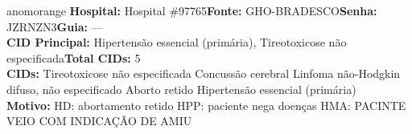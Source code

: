 \documentclass[a4paper,10pt]{article}
\begin{document}
\begin{anomalycard}[Interna\c{c}\~{a}o \#118809 | Pac. \#98548 | ALTO (z=4.33) | LOS: 1d | 26/02/2026\,$\to$\,27/02/2026]{anomorange}
\textbf{Hospital:} Hospital \#97765\quad \textbf{Fonte:} GHO-BRADESCO\quad \textbf{Senha:} JZRNZN3\quad \textbf{Guia:} ---\\

\textbf{CID Principal:} {\small Hipertensão essencial (primária), Tireotoxicose não especificada}\quad\textbf{Total CIDs:} 5\\

\textbf{CIDs:} {\scriptsize Tireotoxicose não especificada \textbar{} Concussão cerebral \textbar{} Linfoma não-Hodgkin difuso, não especificado \textbar{} Aborto retido \textbar{} Hipertensão essencial (primária)}\\

\textbf{Motivo:} {\scriptsize HD: abortamento retido  HPP: paciente nega doenças  HMA: PACINTE VEIO COM INDICAÇÃO DE AMIU}\\



\end{anomalycard}
\end{document}
